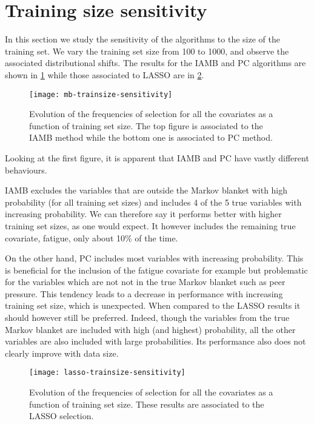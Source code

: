 \documentclass[a4paper, 12pt,oneside]{article}
\begin{document}
    \section{Training size sensitivity}
    In this section we study the sensitivity of the algorithms to the size of the training set. We vary the training set size from 100 to 1000, and observe the associated distributional shifts.
    The results for the IAMB and PC algorithms are shown in \ref{fig:mb-trainsize-sensitivity} while those associated to LASSO are in \ref{fig:lasso-trainsize-sensitivity}.
    \begin{figure}[h!]
        \centering
        \vspace{0em}
        \texttt{[image: mb-trainsize-sensitivity]}
        \caption{Evolution of the frequencies of selection for all the covariates as a function of training set size. The top figure is associated to the IAMB method while the bottom one is associated to PC method.}
        \label{fig:mb-trainsize-sensitivity}
    \end{figure}
    Looking at the first figure, it is apparent that IAMB and PC have vastly different behaviours. 
    
    IAMB excludes the variables that are outside the Markov blanket with high probability (for all training set sizes) and includes 4 of the 5 true variables with increasing probability. We can therefore say it performs better with higher training set sizes, as one would expect. It however includes the remaining true covariate, fatigue, only about 10\% of the time.
    
    On the other hand, PC includes most variables with increasing probability. This is beneficial for the inclusion of the fatigue covariate for example but problematic for the variables which are not not in the true Markov blanket such as peer pressure. This tendency leads to a decrease in performance with increasing training set size, which is unexpected. When compared to the LASSO results it should however still be preferred. Indeed, though the variables from the true Markov blanket are included with high (and highest) probability, all the other variables are also included with large probabilities. Its performance also does not clearly improve with data size.
    \begin{figure}[h!]
        \centering
        \vspace{0em}
        \texttt{[image: lasso-trainsize-sensitivity]}
        \caption{Evolution of the frequencies of selection for all the covariates as a function of training set size. These results are associated to the LASSO selection.}
        \label{fig:lasso-trainsize-sensitivity}
    \end{figure}
\end{document}
